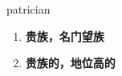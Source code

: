 
\begin{frame}
{\huge patrician}
\begin{center}
\begin{enumerate}\Large
  \item \textbf{贵族，名门望族}
  \item \textbf{贵族的，地位高的}
\end{enumerate}
\end{center}
\end{frame}
